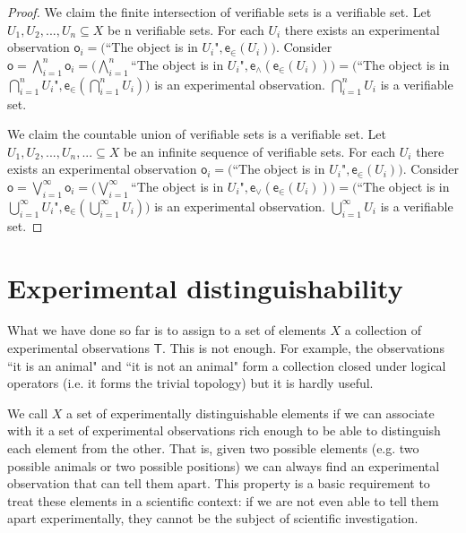 \documentclass[11pt,letterpaper,fleqn]{memoir} %
\begin{document}
\begin{proof}
	We claim the finite intersection of verifiable sets is a verifiable set. Let $U_1, U_2, ... , U_n \subseteq X$ be n verifiable sets. For each $U_i$ there exists an experimental observation $\mathsf{o}_i = ($``The object is in $ U_i \text{"}, \mathsf{e}_\in(U_i))$. Consider $\mathsf{o} = \bigwedge\limits_{i=1}^{n} \mathsf{o}_i = (\bigwedge\limits_{i=1}^{n} $``The object is in $ U_i \text{"}, \mathsf{e}_{\wedge}(\mathsf{e}_\in(U_i)))=( $``The object is in $ \bigcap\limits_{i=1}^{n} U_i \text{"}, \mathsf{e}_\in(\bigcap\limits_{i=1}^{n} U_i))$ is an experimental observation. $\bigcap\limits_{i=1}^{n} U_i$ is a verifiable set.
	
	We claim the countable union of verifiable sets is a verifiable set. Let $U_1, U_2, ... , U_n, ... \subseteq X$ be an infinite sequence of verifiable sets. For each $U_i$ there exists an experimental observation $\mathsf{o}_i = ($``The object is in $ U_i \text{"}, \mathsf{e}_\in(U_i))$. Consider $\mathsf{o} = \bigvee\limits_{i=1}^{\infty} \mathsf{o}_i = (\bigvee\limits_{i=1}^{\infty} $``The object is in $ U_i \text{"}, \mathsf{e}_{\vee}(\mathsf{e}_\in(U_i)))=( $``The object is in $ \bigcup\limits_{i=1}^{\infty} U_i \text{"}, \mathsf{e}_\in(\bigcup\limits_{i=1}^{\infty} U_i))$ is an experimental observation. $\bigcup\limits_{i=1}^{\infty} U_i$ is a verifiable set.
\end{proof}




\section{Experimental distinguishability}

What we have done so far is to assign to a set of elements $X$ a collection of experimental observations $\mathsf{T}$. This is not enough. For example, the observations ``it is an animal" and ``it is not an animal" form a collection closed under logical operators (i.e. it forms the trivial topology) but it is hardly useful.

We call $X$ a set of experimentally distinguishable elements if we can associate with it a set of experimental observations rich enough to be able to distinguish each element from the other. That is, given two possible elements (e.g. two possible animals or two possible positions) we can always find an experimental observation that can tell them apart. This property is a basic requirement to treat these elements in a scientific context: if we are not even able to tell them apart experimentally, they cannot be the subject of scientific investigation.
\end{document}
